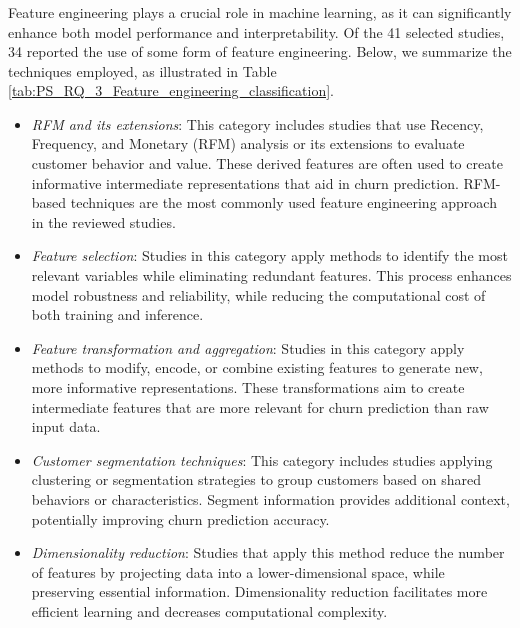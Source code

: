 \subsubsection{\RSRQthree}
\label{sec:RQ3}
Feature engineering plays a crucial role in machine learning, as it can significantly enhance both model performance and interpretability. Of the 41 selected studies, 34 reported the use of some form of feature engineering. Below, we summarize the techniques employed, as illustrated in Table \ref{tab:PS_RQ_3_Feature_engineering_classification}.



\begin{itemize}
    \item \textit{RFM and its extensions}: This category includes studies that use Recency, Frequency, and Monetary (RFM) analysis or its extensions to evaluate customer behavior and value. These derived features are often used to create informative intermediate representations that aid in churn prediction. RFM-based techniques are the most commonly used feature engineering approach in the reviewed studies.
    
    \item \textit{Feature selection}: Studies in this category apply methods to identify the most relevant variables while eliminating redundant features.
    This process enhances model robustness and reliability, while  reducing the computational cost of both training and inference. 
    
    \item \textit{Feature transformation and aggregation}: Studies in this category apply methods to modify, encode, or combine existing features to generate new, more informative representations. These transformations aim to create intermediate features that are more relevant for churn prediction than raw input data.

    \item \textit{Customer segmentation techniques}: This category includes studies applying clustering or segmentation strategies to group customers based on shared behaviors or characteristics. Segment information provides additional context, potentially improving churn prediction accuracy.

    \item \textit{Dimensionality reduction}: Studies that apply this method reduce the number of features by projecting data into a lower-dimensional space, while preserving essential information. Dimensionality reduction facilitates more efficient learning and decreases computational complexity.
\end{itemize}

